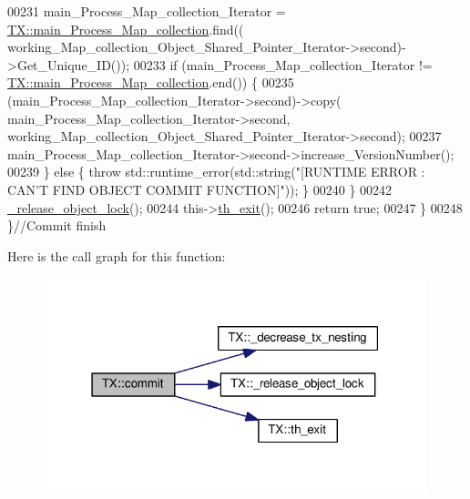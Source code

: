 \begin{DoxyCode}
00231                 main\_Process\_Map\_collection\_Iterator = 
      \hyperlink{class_t_x_a1a45d726894190695314464d7cd97c29_a1a45d726894190695314464d7cd97c29}{TX::main\_Process\_Map\_collection}.find((
      working\_Map\_collection\_Object\_Shared\_Pointer\_Iterator->second)->Get\_Unique\_ID());
00233                 \textcolor{keywordflow}{if} (main\_Process\_Map\_collection\_Iterator != 
      \hyperlink{class_t_x_a1a45d726894190695314464d7cd97c29_a1a45d726894190695314464d7cd97c29}{TX::main\_Process\_Map\_collection}.end()) \{
00235                     (main\_Process\_Map\_collection\_Iterator->second)->copy(
      main\_Process\_Map\_collection\_Iterator->second, working\_Map\_collection\_Object\_Shared\_Pointer\_Iterator->second);
00237                     main\_Process\_Map\_collection\_Iterator->second->increase\_VersionNumber();
00239                 \} \textcolor{keywordflow}{else} \{ \textcolor{keywordflow}{throw} std::runtime\_error(std::string(\textcolor{stringliteral}{"[RUNTIME ERROR : CAN'T FIND OBJECT COMMIT
       FUNCTION]"})); \}
00240         \}
00242         \hyperlink{class_t_x_a4c13d2015dc15d0f788fa9a1413f0463_a4c13d2015dc15d0f788fa9a1413f0463}{\_release\_object\_lock}();
00244         this->\hyperlink{class_t_x_ae045534c4a9d39bd5c6ea2a39a372a79_ae045534c4a9d39bd5c6ea2a39a372a79}{th\_exit}();
00246         \textcolor{keywordflow}{return} \textcolor{keyword}{true};
00247     \}
00248 \}\textcolor{comment}{//Commit finish}
\end{DoxyCode}


Here is the call graph for this function\+:
\nopagebreak
\begin{figure}[H]
\begin{center}
\leavevmode
\includegraphics[width=315pt]{class_t_x_a9dde5d356b35e557448e58d260087356_a9dde5d356b35e557448e58d260087356_cgraph}
\end{center}
\end{figure}


